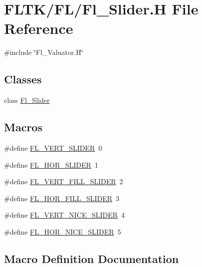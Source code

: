\hypertarget{_fl___slider_8_h}{}\section{F\+L\+T\+K/\+F\+L/\+Fl\+\_\+\+Slider.H File Reference}
\label{_fl___slider_8_h}
{\ttfamily \#include \char`\"{}Fl\+\_\+\+Valuator.\+H\char`\"{}}\newline
\subsection*{Classes}
\begin{DoxyCompactItemize}
\item 
class \hyperlink{class_fl___slider}{Fl\+\_\+\+Slider}
\end{DoxyCompactItemize}
\subsection*{Macros}
\begin{DoxyCompactItemize}
\item 
\#define \hyperlink{_fl___slider_8_h_ac952c3d52e860f41a4bf647ca526e64d}{F\+L\+\_\+\+V\+E\+R\+T\+\_\+\+S\+L\+I\+D\+ER}~0
\item 
\#define \hyperlink{_fl___slider_8_h_a15e20c6f3ef5788814779f64e37b85e5}{F\+L\+\_\+\+H\+O\+R\+\_\+\+S\+L\+I\+D\+ER}~1
\item 
\#define \hyperlink{_fl___slider_8_h_aa10041a3a53ec110d86cbb187e0c8eec}{F\+L\+\_\+\+V\+E\+R\+T\+\_\+\+F\+I\+L\+L\+\_\+\+S\+L\+I\+D\+ER}~2
\item 
\#define \hyperlink{_fl___slider_8_h_a0f28396c8108797c8c5e90ce115fb64e}{F\+L\+\_\+\+H\+O\+R\+\_\+\+F\+I\+L\+L\+\_\+\+S\+L\+I\+D\+ER}~3
\item 
\#define \hyperlink{_fl___slider_8_h_a9b03389408de015ef661f463c5b7a96a}{F\+L\+\_\+\+V\+E\+R\+T\+\_\+\+N\+I\+C\+E\+\_\+\+S\+L\+I\+D\+ER}~4
\item 
\#define \hyperlink{_fl___slider_8_h_a28837c91e984315e09864ee63150062e}{F\+L\+\_\+\+H\+O\+R\+\_\+\+N\+I\+C\+E\+\_\+\+S\+L\+I\+D\+ER}~5
\end{DoxyCompactItemize}


\subsection{Macro Definition Documentation}
\mbox{\label{_fl___slider_8_h_a0f28396c8108797c8c5e90ce115fb64e}} 
